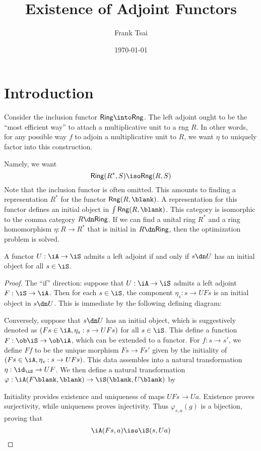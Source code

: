 \documentclass{amsart}
\title{Existence of Adjoint Functors}
\author{Frank Tsai}
\date{\today}
\begin{document}
\maketitle
\tableofcontents

\section{Introduction}
\label{sec:introduction}
Consider the inclusion functor $\mathsf{Ring} \into \mathsf{Rng}$.
The left adjoint ought to be the ``most efficient way'' to attach a multiplicative unit to a rng $R$.
In other words, for any possible way $f$ to adjoin a multiplicative unit to $R$, we want $\eta$ to uniquely factor into this construction.

Namely, we want
\[
  \mathsf{Ring}(R^{*}, S) \iso \mathsf{Rng}(R, S)
\]
Note that the inclusion functor is often omitted.
This amounts to finding a representation $R^{*}$ for the functor $\mathsf{Rng}(R,\blank)$.
A representation for this functor defines an initial object in $\int\mathsf{Rng}(R,\blank)$.
This category is isomorphic to the comma category $R \dn \mathsf{Ring}$.
If we can find a unital ring $R^{*}$ and a ring homomorphism $\eta : R \to R^{*}$ that is initial in $R \dn \mathsf{Ring}$, then the optimization problem is solved.

\begin{lem}
  A functor $U : \iA \to \iS$ admits a left adjoint if and only if $s \dn U$ has an initial object for all $s \in \iS$.
\end{lem}
\begin{proof}
  The ``if'' direction: suppose that $U : \iA \to \iS$ admits a left adjoint $F : \iS \to \iA$.
  Then for each $s \in \iS$, the component $\eta_{s} : s \to UFs$ is an initial object in $s \dn U$.
  This is immediate by the following defining diagram:
  

  Conversely, suppose that $s \dn U$ has an initial object, which is suggestively denoted as $(Fs \in \iA, \eta_{s} : s \to UFs)$ for all $s \in \iS$.
  This define a function $F : \ob\iS \to \ob\iA$, which can be extended to a functor.
  For $f : s \to s'$, we define $Ff$ to be the unique morphism $Fs \to Fs'$ given by the initiality of $(Fs \in \iA, \eta_{s} : s \to UFs)$.
  This data assembles into a natural transformation $\eta : \id_{\iS} \to UF$.
  We then define a natural transformation $\varphi : \iA(F\blank,\blank) \to \iS(\blank,U\blank)$ by
  
  Initiality provides existence and uniqueness of maps $UFs \to Ua$.
  Existence proves surjectivity, while uniqueness proves injectivity.
  Thus $\varphi_{s,a}(g)$ is a bijection, proving that
  \[
    \iA(Fs,a) \iso \iS(s,Ua)
  \]
\end{proof}
\end{document}
